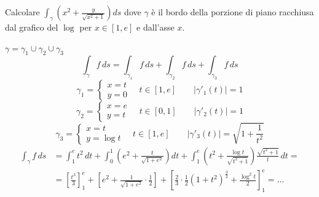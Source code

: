 \begin{example}
Calcolare $\int_\gamma \left( x^2 + \frac{y}{\sqrt{x^2 + 1}} \right) ds$ dove $\gamma$ è il bordo della porzione di piano racchiusa dal grafico del $\log$ per $x \in [1, e]$ e dall'asse $x$.

\begin{center}
\end{center}

$\gamma = \gamma_1 \cup \gamma_2 \cup \gamma_3$
\[
\int_\gamma f \, ds = \int_{\gamma_1} f \, ds + \int_{\gamma_2} f \, ds + \int_{\gamma_3} f \, ds
\]
\[
\gamma_1 = \begin{cases}
x = t \\
y = 0
\end{cases} \quad t \in [1, e] \qquad \vert \gamma'_1(t) \vert = 1
\]
\[
\gamma_2 = \begin{cases}
x = e \\
y = t
\end{cases} \quad t \in [0, 1] \qquad \vert \gamma'_2(t) \vert = 1
\]
\[
\gamma_3 = \begin{cases}
x = t \\
y = \log t
\end{cases} \quad t \in [1, e] \qquad \vert \gamma'_3(t) \vert = \sqrt{1 + \frac{1}{t^2}}
\]
\[
\begin{aligned}
\int_\gamma f \, ds &= \int_1^e t^2 \, dt + \int_0^1 \left( e^2 + \frac{t}{\sqrt{1 + e^2}} \right) dt + \int_1^e \left( t^2 + \frac{\log t}{\sqrt{t^2 + 1}} \right) \frac{\sqrt{t^2 + 1}}{t} \, dt = \\
&= \left[ \frac{t^3}{3} \right]_1^e + \left[ e^2 + \frac{1}{\sqrt{1 + e^2}} \cdot \frac{1}{2} \right] + \left[ \frac{2}{3} \cdot \frac{1}{2} (1 + t^2)^{\frac{3}{2}} + \frac{\log^2 t}{2} \right]_1^e = \dots
\end{aligned}
\]
\end{example}
